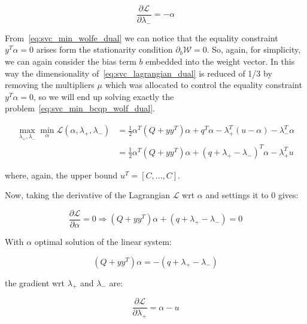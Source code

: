 \begin{equation} \label{eq:svc_lagrangian_der_lm}
    \frac{\partial \mathcal{L}}{\partial \lambda_-}=-\alpha
\end{equation}

From~\eqref{eq:svc_min_wolfe_dual} we can notice that the equality constraint $y^T \alpha = 0$ arises form the stationarity condition $\partial_{{b}} \mathcal{W}=0$. So, again, for simplicity, we can again consider the bias term $b$ embedded into the weight vector. In this way the dimensionality of~\eqref{eq:svc_lagrangian_dual} is reduced of 1/3 by removing the multipliers $\mu$ which was allocated to control the equality constraint $y^T \alpha=0$, so we will end up solving exactly the problem~\eqref{eq:svc_min_bcqp_wolf_dual}.

\begin{equation} \label{eq:svc_bcqp_lagrangian_dual}
	\begin{aligned}
    	\max_{\lambda_+,\lambda_-} \min_{\alpha} \mathcal{L}(\alpha,\lambda_+,\lambda_-) &= \frac{1}{2} \alpha^T (Q + yy^T)\alpha+q^T\alpha - \lambda_+^T (u - \alpha) - \lambda_-^T \alpha \\
    &= \frac{1}{2} \alpha^T (Q + yy^T)\alpha + (q + \lambda_+ - \lambda_-)^T \alpha - \lambda_+^T u
	\end{aligned}
\end{equation}

where, again, the upper bound $u^T = [C, \dots, C]$.

Now, taking the derivative of the Lagrangian $\mathcal{L}$ wrt $\alpha$ and settings it to 0 gives:

\begin{equation} \label{eq:svc_bcqp_lagrangian_der_a}
	\frac{\partial \mathcal{L}}{\partial \alpha}=0\Rightarrow (Q + yy^T) \alpha + (q + \lambda_+ - \lambda_-) = 0
\end{equation}

With $\alpha$ optimal solution of the linear system:

\begin{equation} \label{eq:svc_bcqp_lagrangian_sol}
    (Q + yy^T) \alpha = - (q + \lambda_+ - \lambda_-)
\end{equation}

the gradient wrt $\lambda_+$ and $\lambda_-$ are:

\begin{equation} \label{eq:svc_bcqp_lagrangian_der_lp}
	\frac{\partial \mathcal{L}}{\partial \lambda_+}=\alpha - u
\end{equation}

